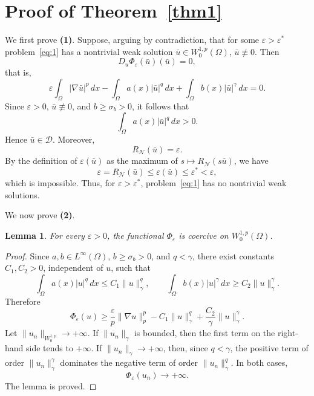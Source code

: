 \documentclass[preprint,11pt]{elsarticle}
\numberwithin{equation}{section}
\newtheorem{lemma}{Lemma}[section]
\begin{document}


\section{Proof of Theorem~\ref{thm1}}

We first prove \textbf{(1)}. Suppose, arguing by contradiction, that for
some \(\varepsilon>\varepsilon^*\) problem~\eqref{eq:1} has a nontrivial weak
solution \(\bar u\in W^{1,p}_0(\Omega)\), \(\bar u\not\equiv0\). Then
\[
D_u\Phi_\varepsilon(\bar u)(\bar u)=0,
\]
that is,
\[
\varepsilon\int_\Omega |\nabla \bar u|^p\,dx
-
\int_\Omega a(x)|\bar u|^q\,dx
+
\int_\Omega b(x)|\bar u|^\gamma\,dx
=0.
\]
Since \(\varepsilon>0\), \(\bar u\not\equiv0\), and \(b\ge\sigma_b>0\), it
follows that
\[
\int_\Omega a(x)|\bar u|^q\,dx>0.
\]
Hence \(\bar u\in\mathcal D\). Moreover,
\[
R_{\mathcal N}(\bar u)=\varepsilon .
\]
By the definition of \(\varepsilon(\bar u)\) as the maximum of
\(s\mapsto R_{\mathcal N}(s\bar u)\), we have
\[
\varepsilon
=
R_{\mathcal N}(\bar u)
\le
\varepsilon(\bar u)
\le
\varepsilon^*
<
\varepsilon ,
\]
which is impossible. Thus, for \(\varepsilon>\varepsilon^*\),
problem~\eqref{eq:1} has no nontrivial weak solutions.

\medskip

We now prove \textbf{(2)}.

\begin{lemma}\label{lem:coer}
	For every \(\varepsilon>0\), the functional \(\Phi_\varepsilon\) is
	coercive on \(W^{1,p}_0(\Omega)\).
\end{lemma}

\begin{proof}
	Since \(a,b\in L^\infty(\Omega)\), \(b\ge\sigma_b>0\), and \(q<\gamma\),
	there exist constants \(C_1,C_2>0\), independent of \(u\), such that
	\[
	\int_\Omega a(x)|u|^q\,dx
	\le
	C_1\|u\|_\gamma^q,
	\qquad
	\int_\Omega b(x)|u|^\gamma\,dx
	\ge
	C_2\|u\|_\gamma^\gamma .
	\]
	Therefore
	\[
	\Phi_\varepsilon(u)
	\ge
	\frac{\varepsilon}{p}\|\nabla u\|_p^p
	-
	C_1\|u\|_\gamma^q
	+
	\frac{C_2}{\gamma}\|u\|_\gamma^\gamma .
	\]
	Let \(\|u_n\|_{W^{1,p}_0}\to+\infty\). If \(\|u_n\|_\gamma\) is bounded,
	then the first term on the right-hand side tends to \(+\infty\). If
	\(\|u_n\|_\gamma\to+\infty\), then, since \(q<\gamma\), the positive term
	of order \(\|u_n\|_\gamma^\gamma\) dominates the negative term of order
	\(\|u_n\|_\gamma^q\). In both cases,
	\[
	\Phi_\varepsilon(u_n)\to+\infty .
	\]
	The lemma is proved.
\end{proof}
\end{document}
